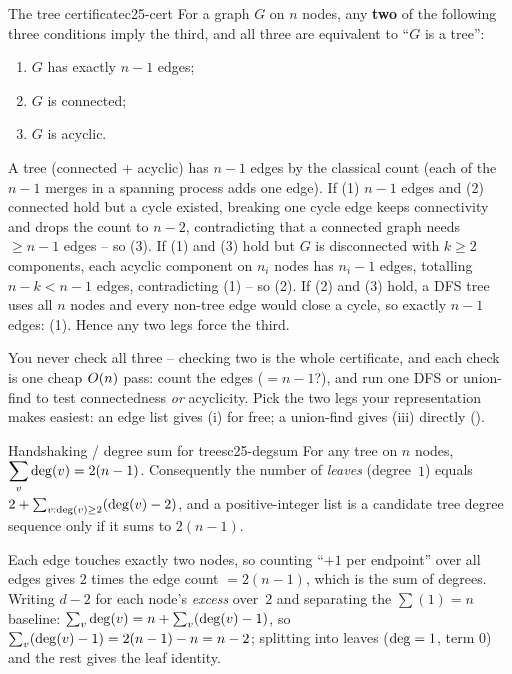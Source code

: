 \begin{theorem}{The tree certificate}{c25-cert}
For a graph $G$ on $n$ nodes, any \textbf{two} of the following three conditions imply the third,
and all three are equivalent to ``$G$ is a tree'':
\begin{enumerate}[nosep, leftmargin=1.6em]
  \item $G$ has exactly $n-1$ edges;
  \item $G$ is connected;
  \item $G$ is acyclic.
\end{enumerate}
\end{theorem}
\begin{proofbox}
A tree (connected + acyclic) has $n-1$ edges by the classical count (each of the $n-1$ merges in a
spanning process adds one edge). If (1) $n-1$ edges and (2) connected hold but a cycle existed,
breaking one cycle edge keeps connectivity and drops the count to $n-2$, contradicting that a
connected graph needs $\ge n-1$ edges -- so (3). If (1) and (3) hold but $G$ is disconnected with
$k\ge2$ components, each acyclic component on $n_i$ nodes has $n_i-1$ edges, totalling
$n-k<n-1$ edges, contradicting (1) -- so (2). If (2) and (3) hold, a DFS tree uses all $n$ nodes and
every non-tree edge would close a cycle, so exactly $n-1$ edges: (1). Hence any two legs force the
third. \end{proofbox}
\begin{insightbox}
You never check all three -- checking two is the whole certificate, and each check is one cheap
$O(n)$ pass: count the edges ($=n-1$?), and run one DFS or union-find to test connectedness
\emph{or} acyclicity. Pick the two legs your representation makes easiest: an edge list gives
(i) for free; a union-find gives (iii) directly ().
\end{insightbox}

\begin{theorem}{Handshaking / degree sum for trees}{c25-degsum}
For any tree on $n$ nodes, $\displaystyle\sum_{v} \operatorname{deg}(v) = 2(n-1)$. Consequently the number of
\emph{leaves} (degree~$1$) equals $2+\sum_{v:\operatorname{deg}(v)\ge 2}(\operatorname{deg}(v)-2)$, and a positive-integer
list is a candidate tree degree sequence only if it sums to $2(n-1)$.
\end{theorem}
\begin{proofbox}
Each edge touches exactly two nodes, so counting ``$+1$ per endpoint'' over all edges gives $2$ times
the edge count $=2(n-1)$, which is the sum of degrees. Writing $d-2$ for each node's \emph{excess}
over~$2$ and separating the $\sum(1)=n$ baseline: $\sum_v\operatorname{deg}(v)=n+\sum_v(\operatorname{deg}(v)-1)$, so
$\sum_v(\operatorname{deg}(v)-1)=2(n-1)-n=n-2$; splitting into leaves ($\operatorname{deg}=1$, term $0$) and the rest gives
the leaf identity. \end{proofbox}

